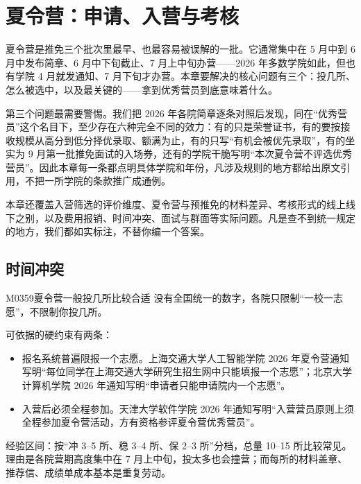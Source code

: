 \chapter{夏令营：申请、入营与考核}
\label{ch07}
\begin{keybox}
夏令营是推免三个批次里最早、也最容易被误解的一批。它通常集中在 5 月中到 6 月中发布简章、6 月中下旬截止、7 月上中旬办营——2026 年多数学院如此，但也有学院 4 月就发通知、7 月下旬才办营。本章要解决的核心问题有三个：投几所、怎么被选中，以及最关键的——拿到优秀营员到底意味着什么。

第三个问题最需要警惕。我们把 2026 年各院简章逐条对照后发现，同在“优秀营员”这个名目下，至少存在六种完全不同的效力：有的只是荣誉证书，有的要按接收规模从高分到低分择优录取、额满为止，有的只写“有机会被优先录取”，有的坐实为 9 月第一批推免面试的入场券，还有的学院干脆写明“本次夏令营不评选优秀营员”。因此本章每一条都点明具体学院和年份，凡涉及规则的地方都给出原文引用，不把一所学院的条款推广成通例。

本章还覆盖入营筛选的评价维度、夏令营与预推免的材料差异、考核形式的线上线下之别，以及费用报销、时间冲突、面试与群面等实际问题。凡是查不到统一规定的地方，我们都如实标注，不替你编一个答案。
\end{keybox}

\section{时间冲突}
\begin{qa}{M0359}{夏令营一般投几所比较合适}
没有全国统一的数字，各院只限制“一校一志愿”，不限制你投几所。

可依据的硬约束有两条：
\begin{itemize}
  \item 报名系统普遍限报一个志愿。上海交通大学人工智能学院 2026 年夏令营通知写明“每位同学在上海交通大学研究生招生网中只能填报一个志愿”；北京大学计算机学院 2026 年通知写明“申请者只能申请院内一个志愿”。
  \item 入营后必须全程参加。天津大学软件学院 2026 年通知写明“入营营员原则上须全程参加夏令营活动，方有资格参评夏令营优秀营员”。
\end{itemize}

经验区间：按“冲 3–5 所、稳 3–4 所、保 2–3 所”分档，总量 10–15 所比较常见。理由是各院营期高度集中在 7 月上中旬，投太多也会撞营；而每所的材料盖章、推荐信、成绩单成本基本是重复劳动。
\end{qa}

